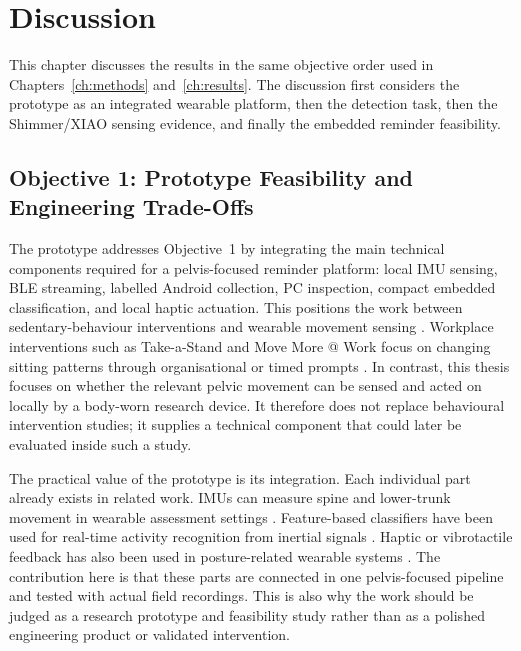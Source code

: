 \chapter{Discussion}\label{ch:discussion}

This chapter discusses the results in the same objective order used in Chapters~\ref{ch:methods} and~\ref{ch:results}. The discussion first considers the prototype as an integrated wearable platform, then the detection task, then the Shimmer/XIAO sensing evidence, and finally the embedded reminder feasibility.

\section{Objective 1: Prototype Feasibility and Engineering Trade-Offs}

The prototype addresses Objective~1 by integrating the main technical components required for a pelvis-focused reminder platform: local IMU sensing, BLE streaming, labelled Android collection, PC inspection, compact embedded classification, and local haptic actuation. This positions the work between sedentary-behaviour interventions \cite{stephenson2017technology_sedentary_meta} and wearable movement sensing \cite{papi2017wearable}. Workplace interventions such as Take-a-Stand and Move More @ Work focus on changing sitting patterns through organisational or timed prompts \cite{pronk2012take,hargreaves2023move}. In contrast, this thesis focuses on whether the relevant pelvic movement can be sensed and acted on locally by a body-worn research device. It therefore does not replace behavioural intervention studies; it supplies a technical component that could later be evaluated inside such a study.

The practical value of the prototype is its integration. Each individual part already exists in related work. IMUs can measure spine and lower-trunk movement in wearable assessment settings \cite{papi2017wearable}. Feature-based classifiers have been used for real-time activity recognition from inertial signals \cite{khan2013exploratory}. Haptic or vibrotactile feedback has also been used in posture-related wearable systems \cite{gopalai2011vibrotactile_posture_system}. The contribution here is that these parts are connected in one pelvis-focused pipeline and tested with actual field recordings. This is also why the work should be judged as a research prototype and feasibility study rather than as a polished engineering product or validated intervention.

